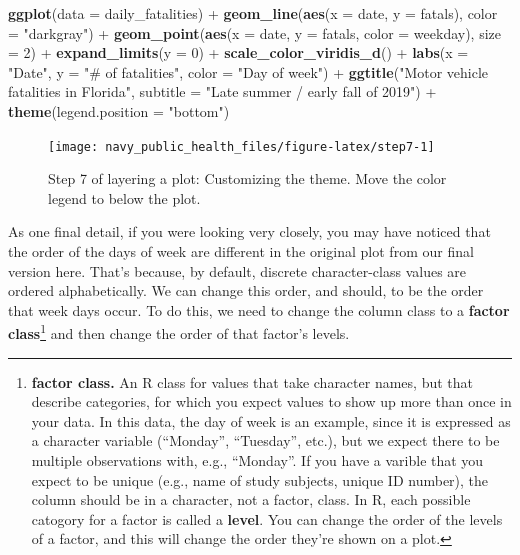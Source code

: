 \documentclass[]{tufte-book}
\newenvironment{Shaded}{}{}
\newcommand{\DataTypeTok}[1]{\textcolor[rgb]{0.56,0.13,0.00}{#1}}
\newcommand{\DecValTok}[1]{\textcolor[rgb]{0.25,0.63,0.44}{#1}}
\newcommand{\KeywordTok}[1]{\textcolor[rgb]{0.00,0.44,0.13}{\textbf{#1}}}
\newcommand{\NormalTok}[1]{#1}
\newcommand{\OperatorTok}[1]{\textcolor[rgb]{0.40,0.40,0.40}{#1}}
\newcommand{\StringTok}[1]{\textcolor[rgb]{0.25,0.44,0.63}{#1}}
\begin{document}
\begin{Shaded}
\begin{Highlighting}[]
\KeywordTok{ggplot}\NormalTok{(}\DataTypeTok{data =}\NormalTok{ daily_fatalities) }\OperatorTok{+}\StringTok{ }\KeywordTok{geom_line}\NormalTok{(}\KeywordTok{aes}\NormalTok{(}\DataTypeTok{x =}\NormalTok{ date, }
    \DataTypeTok{y =}\NormalTok{ fatals), }\DataTypeTok{color =} \StringTok{"darkgray"}\NormalTok{) }\OperatorTok{+}\StringTok{ }\KeywordTok{geom_point}\NormalTok{(}\KeywordTok{aes}\NormalTok{(}\DataTypeTok{x =}\NormalTok{ date, }
    \DataTypeTok{y =}\NormalTok{ fatals, }\DataTypeTok{color =}\NormalTok{ weekday), }\DataTypeTok{size =} \DecValTok{2}\NormalTok{) }\OperatorTok{+}\StringTok{ }
\StringTok{    }\KeywordTok{expand_limits}\NormalTok{(}\DataTypeTok{y =} \DecValTok{0}\NormalTok{) }\OperatorTok{+}\StringTok{ }\KeywordTok{scale_color_viridis_d}\NormalTok{() }\OperatorTok{+}\StringTok{ }
\StringTok{    }\KeywordTok{labs}\NormalTok{(}\DataTypeTok{x =} \StringTok{"Date"}\NormalTok{, }\DataTypeTok{y =} \StringTok{"# of fatalities"}\NormalTok{, }\DataTypeTok{color =} \StringTok{"Day of week"}\NormalTok{) }\OperatorTok{+}\StringTok{ }
\StringTok{    }\KeywordTok{ggtitle}\NormalTok{(}\StringTok{"Motor vehicle fatalities in Florida"}\NormalTok{, }
        \DataTypeTok{subtitle =} \StringTok{"Late summer / early fall of 2019"}\NormalTok{) }\OperatorTok{+}\StringTok{ }
\StringTok{    }\KeywordTok{theme}\NormalTok{(}\DataTypeTok{legend.position =} \StringTok{"bottom"}\NormalTok{)}
\end{Highlighting}
\end{Shaded}

\begin{figure}
\texttt{[image: navy\_public\_health\_files/figure-latex/step7-1]} \caption[Step 7 of layering a plot]{Step 7 of layering a plot: Customizing the theme. Move the color legend to below the plot.}\label{fig:step7}
\end{figure}

As one final detail, if you were looking very closely, you may have noticed that
the order of the days of week are different in the original plot from our final
version here. That's because, by default, discrete character-class values are
ordered alphabetically. We can change this order, and should, to be the order that
week days occur. To do this, we need to change the column class to a
\textbf{factor class}\footnote{\textbf{factor class.} An R class for values that take character names,
  but that describe categories, for which you expect values to show up more than once
  in your data. In this data, the day of week is an example, since it is expressed
  as a character variable (``Monday'', ``Tuesday'', etc.), but we expect there to be
  multiple observations with, e.g., ``Monday''. If you have a varible that you expect
  to be unique (e.g., name of study subjects, unique ID number), the column should
  be in a character, not a factor, class.
  In R, each possible catogory for a factor is called a \textbf{level}.
  You can change the order of the levels of a factor, and this will change the
  order they're shown on a plot.} and then change the order of that factor's levels.
\end{document}
